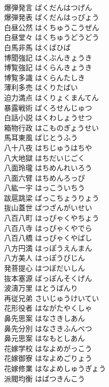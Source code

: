 \documentclass[8pt]{extreport}
\begin{document}
\begin{CJK}{UTF8}{min}
\\	爆弾発言	ばくだんはつげん	
\\	爆弾発表	ばくだんはっぴょう	
\\	白昼公然	はくちゅうこうぜん	
\\	白昼堂々	はくちゅうどうどう	
\\	白馬非馬	はくばひば	
\\	博聞強記	はくぶんきょうき	
\\	博覧強記	はくらんきょうき	
\\	博覧多識	はくらんたしき	
\\	薄利多売	はくりたばい	
\\	迫力満点	はくりょくまんてん	
\\	暴露戦術	ばくろせんじゅつ	
\\	白話小説	はくわしょうせつ	
\\	箱物行政	はこものぎょうせい	
\\	馬耳東風	ばじとうふう	
\\	八十八夜	はちじゅうはちや	
\\	八大地獄	はちだいじごく	
\\	八面玲瓏	はちめんれいろう	
\\	八面六臂	はちめんろっぴ	
\\	八紘一宇	はっこういちう	
\\	跋扈跳梁	ばっこちょうりょう	
\\	抜山蓋世	ばつざんがいせい	
\\	八百八町	はっぴゃくやちょう	
\\	八百八寺	はっぴゃくやでら	
\\	八百八橋	はっぴゃくやばし	
\\	八方円満	はっぽうえんまん	
\\	八方美人	はっぽうびじん	
\\	発菩提心	はつぼだいしん	
\\	抜本塞源	ばっぽんそくげん	
\\	波濤万里	はとうばんり	
\\	再従兄弟	さいじゅうけいてい	
\\	花形役者	はながたやくしゃ	
\\	鼻先思案	はなさきしあん	
\\	鼻先分別	はなさきふんべつ	
\\	鼻元思案	はなもとしあん	
\\	花嫁学校	はなよめがっこう	
\\	花嫁御寮	はなよめごりょう	
\\	花嫁修業	はなよめしゅうぎょう	
\\	派閥均衡	はばつきんこう	

\end{CJK}
\end{document}
